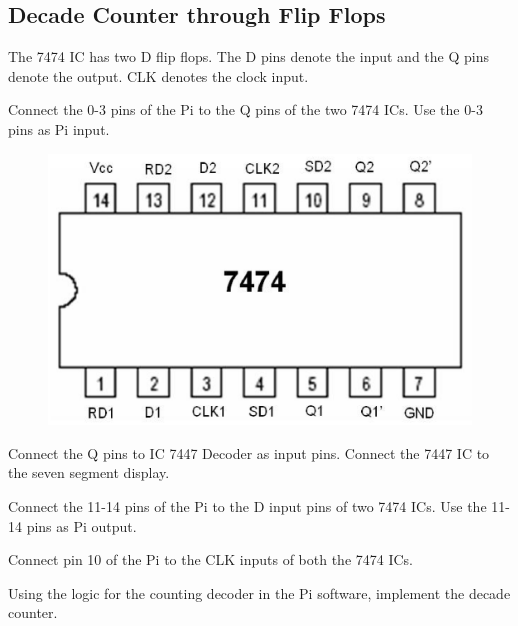 \subsection{Decade Counter through Flip Flops}
%	
The 7474 IC has two D flip flops.  The D pins denote the input and the Q pins denote the output. CLK denotes the clock input.
\begin{problem}
Connect the 0-3 pins of the Pi to the Q pins of the two 7474 ICs. Use the 0-3 pins as Pi input.
\end{problem}
%
\begin{figure}[!ht]
\begin{center}
\includegraphics[width=\columnwidth]{./chapter4/figs/7474IC}
\end{center}
\label{fig_4_1}	
\end{figure}
%
\begin{problem}
Connect the Q pins to IC 7447 Decoder as input pins.  Connect the 7447 IC to the seven segment display.
\end{problem}
\begin{problem}
Connect the 11-14 pins of the Pi to the D input pins of two 7474 ICs. Use the 11-14 pins as Pi output.
\end{problem}
\begin{problem}
Connect pin 10 of the Pi to the CLK inputs of both the 7474 ICs.
\end{problem}
\begin{problem}
Using the logic for the counting decoder in the Pi software, implement the decade counter.
\end{problem}




